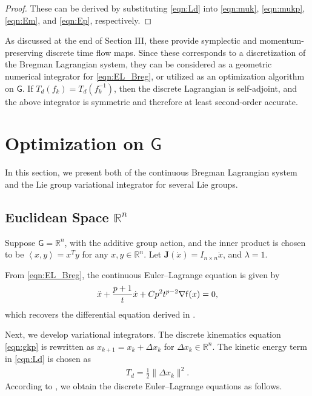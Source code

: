 \documentclass[letterpaper, 10pt, conference]{ieeeconf}
\newcommand{\G}{\ensuremath{\mathsf{G}}}
\renewcommand{\Re}{\ensuremath{\mathbb{R}}}
\newcommand{\pair}[1]{\ensuremath{\left\langle #1 \right\rangle}}
\begin{document}
\begin{proof}
    These can be derived by substituting \eqref{eqn:Ld} into \eqref{eqn:muk}, \eqref{eqn:mukp}, \eqref{eqn:Em}, and \eqref{eqn:Ep}, respectively. 
\end{proof}
As discussed at the end of Section III, these provide symplectic and momentum-preserving discrete time flow maps.
Since these corresponds to a discretization of the Bregman Lagrangian system, they can be considered as a geometric numerical integrator for \eqref{eqn:EL_Breg}, or utilized as an optimization algorithm on $\G$.
If $T_d(f_k)=T_d(f_k^{-1})$, then the discrete Lagrangian is self-adjoint, and the above integrator is symmetric and therefore at least second-order accurate.

\section{Optimization on $\G$}

In this section, we present both of the continuous Bregman Lagrangian system and the Lie group variational integrator for several Lie groups.

\subsection{Euclidean Space $\Re^n$}

Suppose $\G=\Re^n$, with the additive group action, and the inner product is chosen to be $\pair{x,y}=x^Ty$ for any $x,y\in\Re^n$.
Let $\mathbf{J}(\dot x) = I_{n\times n} \dot x$, and $\lambda =1$. 

From \eqref{eqn:EL_Breg}, the continuous Euler--Lagrange equation is given by
\begin{align}
    \ddot x + \frac{p+1}{t} \dot x + Cp^2 t^{p-2} \nabla \mathsf{f}(x) = 0,\label{eqn:EL_Re}
\end{align}
which recovers the differential equation derived in \cite{wibisono2016variational}.

Next, we develop variational integrators. 
The discrete kinematics equation \eqref{eqn:gkp} is rewritten as $x_{k+1} = x_k + \Delta x_k$ for $\Delta x_k\in\Re^n$.
The kinetic energy term in \eqref{eqn:Ld} is chosen as
\begin{align}
    T_d =\frac{1}{2}\|\Delta x_k\|^2.\label{eqn:Td_Re}
\end{align}
According to , we obtain the discrete Euler--Lagrange equations as follows.
\end{document}
